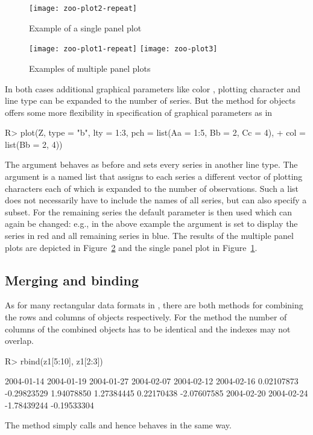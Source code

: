 \documentclass{Z}
\begin{document}
\begin{figure}[b!]
\begin{center}
\texttt{[image: zoo-plot2-repeat]}
\caption{\label{fig:plot2} Example of a single panel plot}
\end{center}
\end{figure}

\begin{figure}[p]
\begin{center}
\texttt{[image: zoo-plot1-repeat]}
\texttt{[image: zoo-plot3]}
\caption{\label{fig:plot13} Examples of multiple panel plots}
\end{center}
\end{figure}


In both cases additional graphical parameters like color ,
plotting character  and line type  can be
expanded to the number of series. But the  method for
 objects offers some more flexibility in specification
of graphical parameters as in
\begin{Schunk}
\begin{Sinput}
R> plot(Z, type = "b", lty = 1:3, pch = list(Aa = 1:5, Bb = 2, Cc = 4), 
+     col = list(Bb = 2, 4))
\end{Sinput}
\end{Schunk}
The argument  behaves as before and sets every series in another
line type. The  argument is a named list that assigns to each series
a different vector of plotting characters each of which is expanded to the 
number of observations. Such a list does not necessarily have to include the names of all
series, but can also specify a subset. For the remaining series the default parameter
is then used which can again be changed: e.g., in the above example the  argument
is set to display the series  in red and all remaining series in blue.
The results of the multiple panel plots are depicted in Figure~\ref{fig:plot13} and the
single panel plot in Figure~\ref{fig:plot2}.


\subsection{Merging and binding}
\label{sec:merge}

As for many rectangular data formats in , there are
both methods for combining the rows and columns of 
objects respectively. For the  method the number of
columns of the combined objects has to be identical and the
indexes may not overlap.
\begin{Schunk}
\begin{Sinput}
R> rbind(z1[5:10], z1[2:3])
\end{Sinput}
\begin{Soutput}
 2004-01-14  2004-01-19  2004-01-27  2004-02-07  2004-02-12  2004-02-16 
 0.02107873 -0.29823529  1.94078850  1.27384445  0.22170438 -2.07607585 
 2004-02-20  2004-02-24 
-1.78439244 -0.19533304 
\end{Soutput}
\end{Schunk}
The  method simply calls  and hence behaves in the same way.
\end{document}

